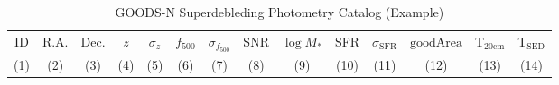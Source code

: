 % 
\begin{table*}

\begin{center}

\caption{ %
    GOODS-N Superdebleding Photometry Catalog (Example) %
    \label{Table_2} %
}

\begin{tabular}{ cccccccccccccc }

    \hline

        ID & 
        R.A. & 
        Dec. & 
        $z$ & 
        $\sigma_{z}$ & 
        $f_{500}$ & 
        $\sigma_{f_{500}}$ & 
        SNR & 
        $\log{M_{*}}$ & 
        SFR & 
        $\sigma_{\mathrm{SFR}}$ & 
        ${\mathrm{goodArea}}$ & 
        T$_{\mathrm{20cm}}$ & 
        T$_{\mathrm{SED}}$ \\ 
        
        (1) & 
        (2) & 
        (3) & 
        (4) & 
        (5) & 
        (6) & 
        (7) & 
        (8) & 
        (9) & 
        (10) & 
        (11) & 
        (12) & 
        (13) & 
        (14) \\ 
    
    \hline


\end{tabular}
\end{center}
\end{table*}
